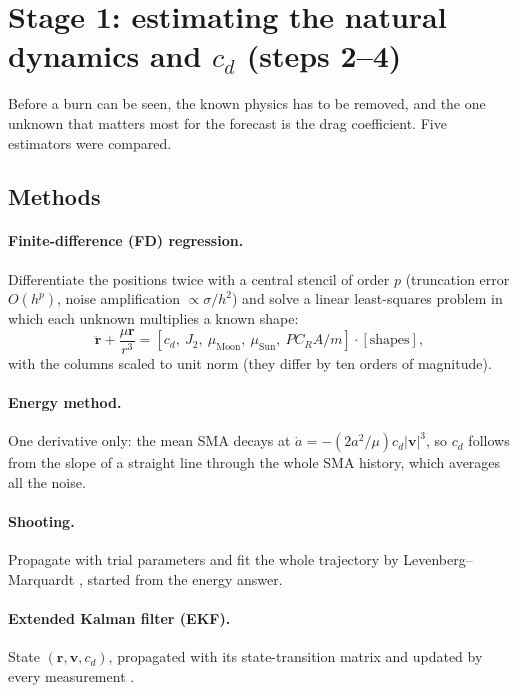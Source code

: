 \documentclass[11pt,a4paper]{article}
\begin{document}
\section{Stage 1: estimating the natural dynamics and $c_d$ (steps 2--4)}\label{sec:cd}
Before a burn can be seen, the known physics has to be removed, and the one unknown that matters most for the
forecast is the drag coefficient. Five estimators were compared.

\subsection{Methods}
\paragraph{Finite-difference (FD) regression.} Differentiate the positions twice with a central stencil of order
$p$ (truncation error $O(h^p)$, noise amplification $\propto\sigma/h^2$) and solve a linear least-squares problem
in which each unknown multiplies a known shape:
\begin{equation}
  \ddot{\mathbf r} + \frac{\mu\mathbf r}{r^3} = [c_d,\ J_2,\ \mu_{\text{Moon}},\ \mu_{\text{Sun}},\ PC_RA/m]\cdot[\text{shapes}],
\end{equation}
with the columns scaled to unit norm (they differ by ten orders of magnitude).
\paragraph{Energy method.} One derivative only: the mean SMA decays at $\dot a = -(2a^2/\mu)c_d|\mathbf v|^3$, so
$c_d$ follows from the slope of a straight line through the whole SMA history, which averages all the noise.
\paragraph{Shooting.} Propagate with trial parameters and fit the whole trajectory by Levenberg--Marquardt
\cite{scipy}, started from the energy answer.
\paragraph{Extended Kalman filter (EKF).} State $(\mathbf r,\mathbf v,c_d)$, propagated with its state-transition
matrix and updated by every measurement \cite{kalman}.
\end{document}
